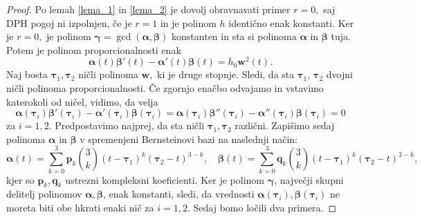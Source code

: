 \documentclass[12pt,a4paper,twoside]{article}
\theoremstyle{definition} %
\theoremstyle{plain} %
\theoremstyle{primerstyle}
\numberwithin{equation}{section}  %
\newcommand{\pV}{\mathbf{p}}
\newcommand{\qV}{\mathbf{q}}
\newcommand{\wV}{\mathbf{w}}
\newcommand{\balpha}{\boldsymbol \alpha}
\newcommand{\bbeta}{\boldsymbol \beta}
\newcommand{\bgamma}{\boldsymbol \gamma}
\newcommand{\btau}{\boldsymbol \tau}
\begin{document}
\begin{proof}
	Po lemah \ref{lema_1} in \ref{lema_2} je dovolj obravnavati primer $r=0,$ saj DPH pogoj ni izpolnjen, če je $r=1$ in je polinom $h$ identično enak konstanti. Ker je $r=0,$ je polinom $\bgamma=\gcd(\balpha,\bbeta)$ konstanten in sta si polinoma $\balpha$ in $\bbeta$ tuja. Potem je polinom proporcionalnosti enak
	\begin{equation}
		\balpha(t)\bbeta'(t)-\balpha'(t)\bbeta(t)=h_0\wV^2(t).
	\end{equation}
	Naj bosta $\btau_1,\btau_2$ ničli polinoma $\wV,$ ki je druge stopnje. Sledi, da sta $\btau_1$, $\btau_2$ dvojni ničli polinoma proporcionalnosti. Če zgornjo enačbo odvajamo in vstavimo katerokoli od ničel, vidimo, da velja
	\begin{equation}
		\label{enacbe_propoly_tau}
		\balpha(\btau_i)\bbeta'(\btau_i)-\balpha'(\btau_i)\bbeta(\btau_i)=\balpha(\btau_i)\bbeta''(\btau_i)-\balpha''(\btau_i)\bbeta(\btau_i)=0
	\end{equation}
	za $i=1,2.$ Predpostavimo najprej, da sta ničli $\btau_1,\btau_2$ različni. Zapišimo sedaj polinoma $\balpha$ in $\bbeta$ v spremenjeni Bernsteinovi bazi na naslednji način:
	\begin{equation*}
		\balpha(t)=\sum_{k=0}^3\pV_k\binom{3}{k}(t-\btau_1)^k(\btau_2-t)^{3-k},\quad\bbeta(t)=\sum_{k=0}^3\qV_k\binom{3}{k}(t-\btau_1)^k(\btau_2-t)^{3-k},
	\end{equation*}
	kjer so $\pV_k,\qV_k$ ustrezni kompleksni koeficienti. Ker je polinom $\bgamma$, največji skupni delitelj polinomov $\balpha,\bbeta$, enak konstanti, sledi, da vrednosti $\balpha(\btau_i),\bbeta(\btau_i)$ ne moreta biti obe hkrati enaki nič za $i=1,2.$ Sedaj bomo ločili dva primera.
	

\end{proof}
\end{document}
